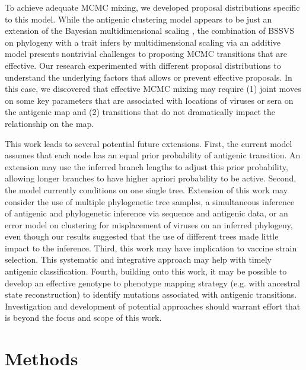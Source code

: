 \documentclass[11pt,oneside,letterpaper]{article}
\begin{document}
To achieve adequate MCMC mixing, we developed proposal distributions specific to this model. 
While the antigenic clustering model appears to be just an extension of the Bayesian multidimensional scaling \cite{bedford_integrating_2014}, the combination of BSSVS on phylogeny with a trait infers by multidimensional scaling via an additive model presents nontrivial challenges to proposing MCMC transitions that are effective. 
Our research experimented with different proposal distributions to understand the underlying factors that allows or prevent effective proposals. 
In this case, we discovered that effective MCMC mixing may require (1) joint moves on some key parameters that are associated with locations of viruses or sera on the antigenic map and (2) transitions that do not dramatically impact the relationship on the map.


This work leads to several potential future extensions. 
First, the current model assumes that each node has an equal prior probability of antigenic transition. 
An extension may use the inferred branch lengths to adjust this prior probability, allowing longer branches to have higher apriori probability to be active.
Second, the model currently conditions on one single tree. 
Extension of this work may consider the use of multiple phylogenetic tree samples, a simultaneous inference of antigenic and phylogenetic inference via sequence and antigenic data, or  an error model on clustering for misplacement of viruses on an inferred phylogeny, even though our results suggested that the use of different trees made little impact to the inference. 
Third, this work may have implication to vaccine strain selection. 
This systematic and integrative approach may help with timely antigenic classification. 
Fourth, building onto this work, it may be possible to develop an effective genotype to phenotype mapping strategy (e.g. with ancestral state reconstruction) to identify mutations associated with antigenic transitions. 
Investigation and development of potential approaches should warrant effort that is beyond the focus and scope of this work.






\newpage




\section*{Methods}
\end{document}
